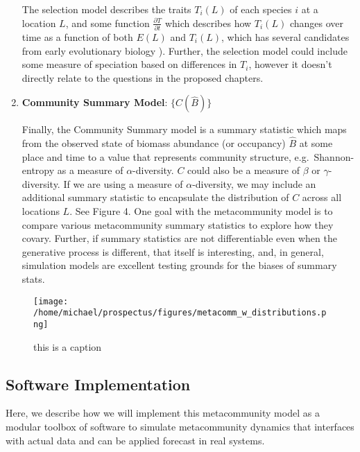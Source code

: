 \documentclass[]{article}
\begin{document}
\begin{enumerate}
  The selection model describes the traits \(T_i(L)\) of each species
  \(i\) at a location \(L\), and some function
  \(\frac{\partial T}{\partial t}\) which describes how \(T_i(L)\)
  changes over time as a function of both \(E(L)\) and \(T_i(L)\), which
  has several candidates from early evolutionary biology
  \citep{cite}). Further, the selection model could include some
  measure of speciation based on differences in \(T_i\), however it
  doesn't directly relate to the questions in the proposed chapters.
\item
  \textbf{Community Summary Model}: \(\{ C(\hat{B}) \}\)

  Finally, the Community Summary model is a summary statistic which maps
  from the observed state of biomass abundance (or occupancy)
  \(\hat{B}\) at some place and time to a value that represents
  community structure, e.g.~Shannon-entropy as a measure of
  \(\alpha\)-diversity. \(C\) could also be a measure of \(\beta\) or
  \(\gamma\)-diversity. If we are using a measure of
  \(\alpha\)-diversity, we may include an additional summary statistic
  to encapsulate the distribution of \(C\) across all locations \(L\).
  See Figure 4. One goal with the metacommunity model is to compare
  various metacommunity summary statistics to explore how they covary.
  Further, if summary statistics are not differentiable even when the
  generative process is different, that itself is interesting, and, in
  general, simulation models are excellent testing grounds for the
  biases of summary stats.
\end{enumerate}

\begin{figure}[H]
\centering
\texttt{[image: /home/michael/prospectus/figures/metacomm\_w\_distributions.png]}
\caption{this is a caption}
\end{figure}

\hypertarget{software-implementation}{%
\subsection{Software Implementation}\label{software-implementation}}

Here, we describe how we will implement this metacommunity model as a
modular toolbox of software to simulate metacommunity dynamics that
interfaces with actual data and can be applied forecast in real systems.
\end{document}
